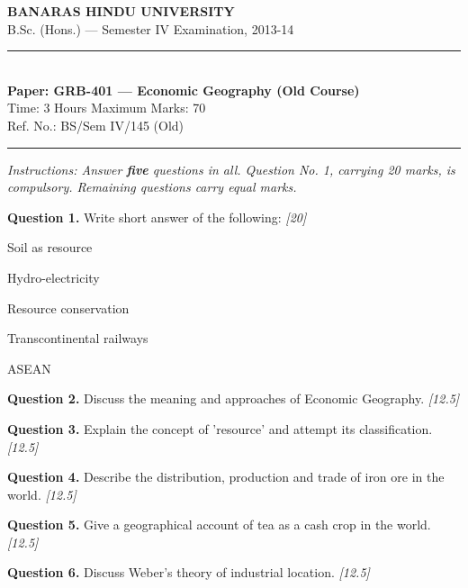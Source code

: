 \documentclass[11pt,a4paper]{article}
\newcommand{\pts}[1]{\hfill   \textit{[#1]}}
\begin{document}
\begin{center}
  {\large\bfseries BANARAS HINDU UNIVERSITY}\\[2pt]
  {\normalsize B.Sc. (Hons.) --- Semester IV Examination, 2013-14}\\[6pt]
  \rule{0.8\linewidth}{0.5pt}\\[6pt]
  {\large\bfseries Paper: GRB-401 --- Economic Geography (Old Course)}\\[4pt]
  {\normalsize Time: 3 Hours \hfill Maximum Marks: 70}\\[2pt]
  {\small Ref. No.: BS/Sem IV/145 (Old)}
\end{center}
\rule{\linewidth}{0.4pt}
\smallskip



\noindent   \textit{Instructions: Answer   \textbf{five} questions in all. Question No. 1, carrying 20 marks, is compulsory. Remaining questions carry equal marks.}
\bigskip




\noindent   \textbf{Question 1.} Write short answer of the following: \pts{20}

\begin{parts}
  \item Soil as resource
  \item Hydro-electricity
  \item Resource conservation
  \item Transcontinental railways
  \item ASEAN
\end{parts}

\medskip


\noindent   \textbf{Question 2.} Discuss the meaning and approaches of Economic Geography. \pts{12.5}

\medskip


\noindent   \textbf{Question 3.} Explain the concept of 'resource' and attempt its classification. \pts{12.5}

\medskip


\noindent   \textbf{Question 4.} Describe the distribution, production and trade of iron ore in the world. \pts{12.5}

\medskip


\noindent   \textbf{Question 5.} Give a geographical account of tea as a cash crop in the world. \pts{12.5}

\medskip


\noindent   \textbf{Question 6.} Discuss Weber's theory of industrial location. \pts{12.5}
\end{document}
